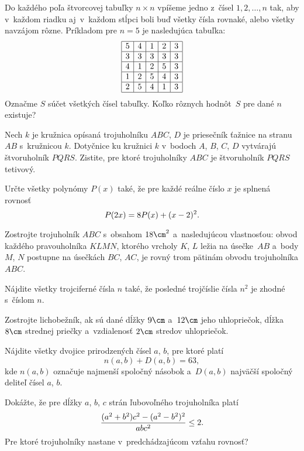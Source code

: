 {%
Do každého poľa štvorcovej tabuľky $n\times n$ vpíšeme jedno
z~čísel $1,2,\dots,n$ tak, aby v~každom riadku aj~v~každom stĺpci boli
buď všetky čísla rovnaké, alebo všetky navzájom rôzne. Príkladom pre $n=5$
je nasledujúca tabuľka:
$$
\begin{array}{|c|c|c|c|c|}
\hline
5 & 4 & 1 & 2 & 3 \\
\hline
3 & 3 & 3 & 3 & 3 \\
\hline
4 & 1 & 2 & 5 & 3 \\
\hline
1 & 2 & 5 & 4 & 3 \\
\hline
2 & 5 & 4 & 1 & 3 \\
\hline
\end{array}
$$
Označme $S$ súčet všetkých čísel tabuľky. Koľko rôznych hodnôt~$S$ pre
dané $n$ existuje?}

{%
Nech $k$ je kružnica opísaná trojuholníku $ABC$, $D$ je priesečník
ťažnice na stranu~$AB$ s~kružnicou $k$. Dotyčnice ku kružnici $k$ v~bodoch
$A$, $B$, $C$, $D$ vytvárajú štvoruholník $PQRS$. Zistite, pre ktoré
trojuholníky $ABC$ je štvoruholník $PQRS$ tetivový.}

{%
Určte všetky polynómy $P(x)$ také, že pre každé reálne číslo $x$
je splnená rovnosť
$$
  \postdisplaypenalty 10000
  P(2x)=8P(x)+(x-2)^2.
$$}

{%
Zostrojte trojuholník $ABC$ s~obsahom $18\cm^2$ a~nasledujúcou
vlastnosťou: obvod každého pravouholníka $KLMN$, ktorého vrcholy $K$, $L$
ležia na úsečke~$AB$ a~body $M$, $N$ postupne na úsečkách $BC$,
$AC$, je rovný trom pätinám obvodu trojuholníka $ABC$.}

{%
Nájdite všetky trojciferné čísla $n$ také, že posledné trojčíslie
čísla $n^2$ je zhodné s~číslom $n$.}

{%
Zostrojte lichobežník, ak sú dané dĺžky $9\cm$ a~$12\cm$ jeho
uhlopriečok, dĺžka $8\cm$ strednej priečky a~vzdialenosť $2\cm$ stredov
uhlopriečok.}

{%
Nájdite všetky dvojice prirodzených čísel $a$, $b$, pre ktoré platí
$$
  n(a,b) + D(a,b) = 63,
$$
kde $n(a,b)$ označuje najmenší spoločný násobok a~$D(a,b)$ najväčší
spoločný deliteľ čísel $a$, $b$.}

{%
Dokážte, že pre dĺžky $a$, $b$, $c$ strán ľubovoľného trojuholníka
platí
$$
  {(a^2+b^2)c^2-(a^2-b^2)^2\over abc^2}\le2.
$$
Pre ktoré trojuholníky nastane v~predchádzajúcom vzťahu rovnosť?}

